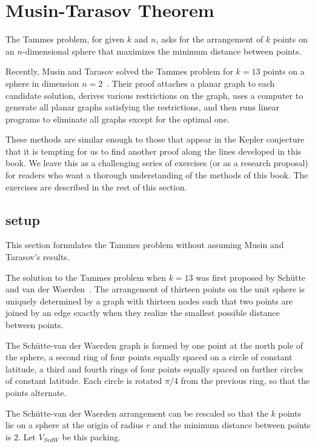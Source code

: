 \section{Musin-Tarasov Theorem}

The Tammes problem, for given $k$ and $n$, asks for the arrangement of
$k$ points on an $n$-dimensional sphere that maximizes the minimum
distance between points.

Recently, Musin and Tarasov solved the Tammes problem for $k=13$
points on a sphere in dimension $n=2$~\cite{Musin-Tarasov}.  Their
proof attaches a planar graph to each candidate solution, derives
various restrictions on the graph, uses a computer to generate all
planar graphs satisfying the restrictions, and then runs linear programs
to eliminate all graphs except for the optimal one.

These methods are similar enough to those that appear in the Kepler
conjecture that it is tempting for us to find another proof along the
lines developed in this book.  We leave this as a challenging series
of exercises (or as a research proposal) for readers who want a
thorough understanding of the methods of this book.  The exercises are
described in the rest of this section.

\subsection{setup}

This section formulates the Tammes problem without assuming 
 Musin and Tarasov's results.

The solution to the Tammes problem when $k=13$ was first proposed by
Sch\"utte and van der Waerden~\cite{vanderWaerden:1951}.  The arrangement of thirteen
points on the unit sphere is uniquely determined by a graph with thirteen
nodes such that two points are joined by an edge exactly when they
realize the smallest possible distance between points.

The Sch\"utte-van der Waerden graph is formed by one point at the north
pole of the sphere, a second ring of four points equally spaced on a
circle of constant latitude, a third and fourth rings of four points
equally spaced on further circles of constant latitude.  Each circle
is rotated $\pi/4$ from the previous ring, so that the points
alternate.

The Sch\"utte-van der Waerden arrangement can be rescaled so that the
$k$ points lie on a sphere at the origin of radius $r$ and 
the minimum distance between points is $2$.  Let $V_{SvdW}$ be this
packing.

